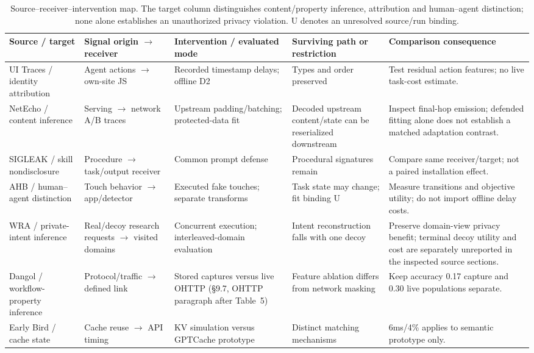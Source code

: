 \begin{table}[t]\centering\footnotesize
\caption{Source--receiver--intervention map. The target column distinguishes content/property inference, attribution and human--agent distinction; none alone establishes an unauthorized privacy violation. U denotes an unresolved source/run binding.}\label{tab:receiver-intervention-matrix}
\begin{tabularx}{\textwidth}{@{}p{}p{}p{}YY@{}}\toprule
Source / target & Signal origin $\to$ receiver & Intervention / evaluated mode & Surviving path or restriction & Comparison consequence\\\midrule
UI Traces / identity attribution & Agent actions $\to$ own-site JS & Recorded timestamp delays; offline D2 & Types and order preserved & Test residual action features; no live task-cost estimate.\\
NetEcho / content inference & Serving $\to$ network A/B traces & Upstream padding/batching; protected-data fit & Decoded upstream content/state can be reserialized downstream & Inspect final-hop emission; defended fitting alone does not establish a matched adaptation contrast.\\
SIGLEAK / skill nondisclosure & Procedure $\to$ task/output receiver & Common prompt defense & Procedural signatures remain & Compare same receiver/target; not a paired installation effect.\\
AHB / human--agent distinction & Touch behavior $\to$ app/detector & Executed fake touches; separate transforms & Task state may change; fit binding U & Measure transitions and objective utility; do not import offline delay costs.\\
WRA / private-intent inference & Real/decoy research requests $\to$ visited domains & Concurrent execution; interleaved-domain evaluation & Intent reconstruction falls with one decoy & Preserve domain-view privacy benefit; terminal decoy utility and cost are separately unreported in the inspected source sections.\\
Dangol / workflow-property inference & Protocol/traffic $\to$ defined link & Stored captures versus live OHTTP (\S9.7, OHTTP paragraph after Table~5) & Feature ablation differs from network masking & Keep accuracy 0.17 capture and 0.30 live populations separate.\\
Early Bird / cache state & Cache reuse $\to$ API timing & KV simulation versus GPTCache prototype & Distinct matching mechanisms & 6ms/4\% applies to semantic prototype only.\\

\end{tabularx}
\end{table}
